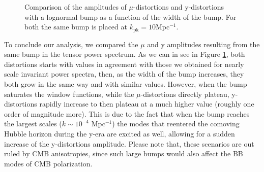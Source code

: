 \begin{figure}[]
    \centering
{}
\caption{Comparison of the amplitudes of $\mu$-distortions  and y-distortions with a lognormal bump as a function of the width of the bump. For both the same bump is placed at $k_\text{pk}=10$Mpc$^{-1}$.}
\label{fig:muy_plateau}
\end{figure}

To conclude our analysis, we compared the $\mu$ and y amplitudes resulting from the same bump in the tensor power spectrum. As we can in see in Figure \ref{fig:muy_plateau}, both distortions starts with values in agreement with those we obtained for nearly scale invariant power spectra, then, as the width of the bump increases, they both grow in the same way and with similar values. However, when the bump saturates the window functions, while the $\mu$-distortions directly plateau, y-distortions rapidly increase to then plateau at a much higher value (roughly one order of magnitude more). This is due to the fact that when the bump reaches the largest scales ($k\sim10^{-4}$ Mpc$^{-1}$) the modes that reentered the comoving Hubble horizon during the y-era are excited as well, allowing for a sudden increase of the y-distortions amplitude. Please note that, these scenarios are out ruled by CMB anisotropies, since such large bumps would also affect the BB modes of CMB polarization. 